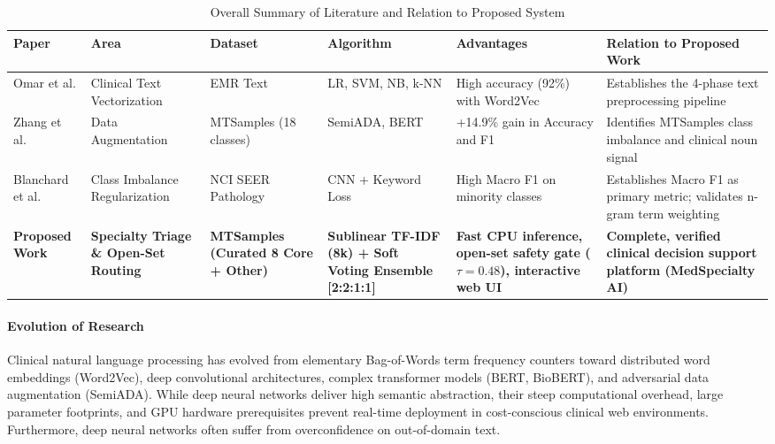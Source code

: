 \begin{table}[H]
\centering
\small
\setlength{\tabcolsep}{4pt}
\begin{tabularx}{\linewidth}{|>{\raggedright\arraybackslash}p{2.2cm}|>{\raggedright\arraybackslash}p{2.1cm}|>{\raggedright\arraybackslash}p{2.1cm}|>{\raggedright\arraybackslash}X|>{\raggedright\arraybackslash}p{2.2cm}|>{\raggedright\arraybackslash}X|}
\hline
\textbf{Paper} & \textbf{Area} & \textbf{Dataset} & \textbf{Algorithm} & \textbf{Advantages} & \textbf{Relation to Proposed Work} \\
\hline
Omar et al. \cite{omar2023} & Clinical Text Vectorization & EMR Text & LR, SVM, NB, k-NN & High accuracy (92\%) with Word2Vec & Establishes the 4-phase text preprocessing pipeline \\
\hline
Zhang et al. \cite{zhang2023} & Data Augmentation & MTSamples (18 classes) & SemiADA, BERT & +14.9\% gain in Accuracy and F1 & Identifies MTSamples class imbalance and clinical noun signal \\
\hline
Blanchard et al. \cite{blanchard2022} & Class Imbalance Regularization & NCI SEER Pathology & CNN + Keyword Loss & High Macro F1 on minority classes & Establishes Macro F1 as primary metric; validates n-gram term weighting \\
\hline
\textbf{Proposed Work} & \textbf{Specialty Triage \& Open-Set Routing} & \textbf{MTSamples (Curated 8 Core + Other)} & \textbf{Sublinear TF-IDF (8k) + Soft Voting Ensemble [2:2:1:1]} & \textbf{Fast CPU inference, open-set safety gate ($\tau=0.48$), interactive web UI} & \textbf{Complete, verified clinical decision support platform (MedSpecialty AI)} \\
\hline
\end{tabularx}
\caption{Overall Summary of Literature and Relation to Proposed System}
\label{tab:overall_summary}
\end{table}

\paragraph{Evolution of Research}
Clinical natural language processing has evolved from elementary Bag-of-Words term frequency counters toward distributed word embeddings (Word2Vec), deep convolutional architectures, complex transformer models (BERT, BioBERT), and adversarial data augmentation (SemiADA). While deep neural networks deliver high semantic abstraction, their steep computational overhead, large parameter footprints, and GPU hardware prerequisites prevent real-time deployment in cost-conscious clinical web environments. Furthermore, deep neural networks often suffer from overconfidence on out-of-domain text.

